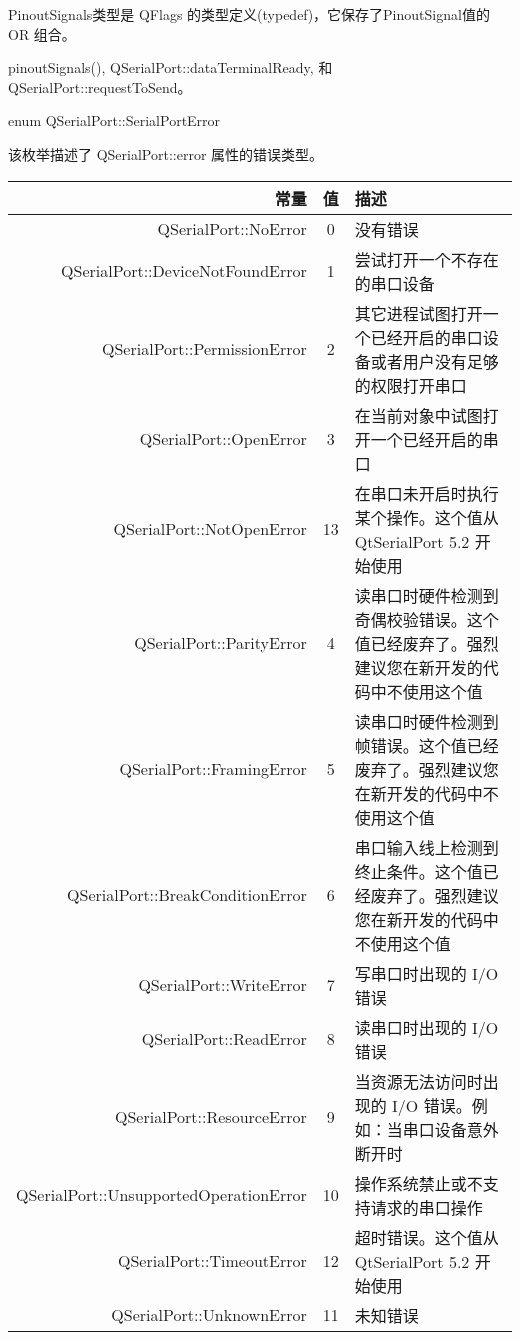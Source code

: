 PinoutSignals类型是 QFlags 的类型定义(typedef)，它保存了PinoutSignal值的 OR 组合。

\begin{seeAlso}
pinoutSignals(), QSerialPort::dataTerminalReady, 和 QSerialPort::requestToSend。
\end{seeAlso}

enum QSerialPort::SerialPortError

该枚举描述了 QSerialPort::error 属性的错误类型。

\begin{longtable}{|r|c|m{9em}|}
	\hline
	常量	&值&	描述 \\ 
	\hline 
	QSerialPort::NoError &	0 &	没有错误 \\ 
	\hline
	QSerialPort::DeviceNotFoundError &	1 &	尝试打开一个不存在的串口设备 \\ 
	\hline
	QSerialPort::PermissionError 	&2 	&其它进程试图打开一个已经开启的串口设备或者用户没有足够的权限打开串口 \\ 
	\hline
	QSerialPort::OpenError &	3& 	在当前对象中试图打开一个已经开启的串口 \\ 
	\hline
	QSerialPort::NotOpenError 	&13 &	在串口未开启时执行某个操作。这个值从 QtSerialPort 5.2 开始使用 \\
	\hline 
	QSerialPort::ParityError &	4 &	读串口时硬件检测到奇偶校验错误。这个值已经废弃了。强烈建议您在新开发的代码中不使用这个值 \\ 
	\hline
	QSerialPort::FramingError &	5 &	读串口时硬件检测到帧错误。这个值已经废弃了。强烈建议您在新开发的代码中不使用这个值 \\ 
	\hline
	QSerialPort::BreakConditionError &	6 &	串口输入线上检测到终止条件。这个值已经废弃了。强烈建议您在新开发的代码中不使用这个值 \\ 
	\hline
	QSerialPort::WriteError &	7 	&写串口时出现的 I/O 错误 \\ 
	\hline
	QSerialPort::ReadError &	8 &	读串口时出现的 I/O 错误 \\ 
\hline
	QSerialPort::ResourceError 	&9 	&当资源无法访问时出现的 I/O 错误。例如：当串口设备意外断开时 \\ 
	\hline
	QSerialPort::UnsupportedOperationError& 	10 &	操作系统禁止或不支持请求的串口操作 \\ 
	\hline
	QSerialPort::TimeoutError 	&12 &	超时错误。这个值从 QtSerialPort 5.2 开始使用 \\ 
	\hline
	QSerialPort::UnknownError &	11 &	未知错误 \\ 
	\hline
\end{longtable}


